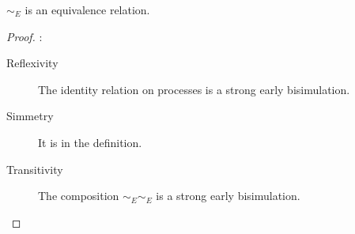 
 

\begin{proposition}
  $\sim_{E}$ is an equivalence relation.
  \begin{proof}:
    \begin{description}
      \item[Reflexivity]
	The identity relation on processes is a strong early bisimulation.
      \item[Simmetry]
	It is in the definition.
      \item[Transitivity]
	The composition $\sim_{E} \sim_{E}$ is a strong early bisimulation.
    \end{description}
  \end{proof}
\end{proposition}

